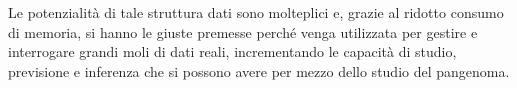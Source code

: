 \documentclass[a4paper,11pt, oneside,italian]{article}
\begin{document}
Le potenzialità di tale struttura dati sono molteplici e, grazie al
ridotto consumo di memoria, si hanno le giuste premesse perché venga utilizzata
per gestire e interrogare grandi moli di dati reali, incrementando le capacità
di studio, previsione e inferenza che si possono avere per mezzo dello studio
del pangenoma.
\end{document}
